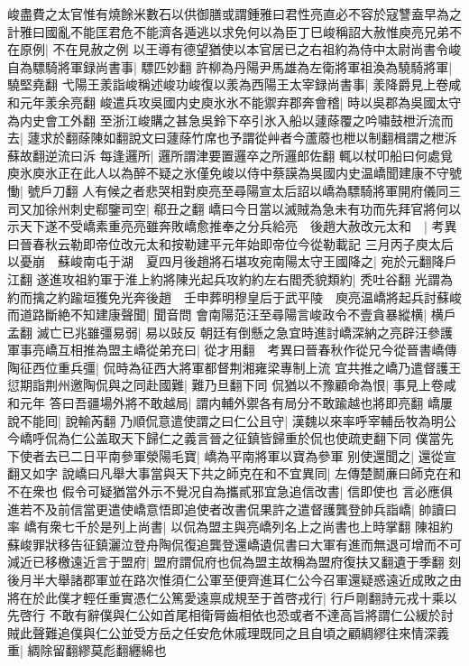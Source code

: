 峻盡費之太官惟有燒餘米數石以供御膳或謂鍾雅曰君性亮直必不容於寇讐盍早為之計雅曰國亂不能匡君危不能濟各遁逃以求免何以為臣丁巳峻稱詔大赦惟庾亮兄弟不在原例|{
	不在見赦之例}
以王導有德望猶使以本官居已之右祖約為侍中太尉尚書令峻自為驃騎將軍録尚書事|{
	驃匹妙翻}
許柳為丹陽尹馬雄為左衛將軍祖渙為驍騎將軍|{
	驍堅堯翻}
弋陽王羕詣峻稱述峻功峻復以羕為西陽王太宰録尚書事|{
	羕降爵見上卷咸和元年羕余亮翻}
峻遣兵攻吳國内史庾氷氷不能禦弃郡奔會稽|{
	時以吳郡為吳國太守為内史會工外翻}
至浙江峻購之甚急吳鈴下卒引氷入船以蘧蒢覆之吟嘯鼓枻沂流而去|{
	蘧求於翻蒢陳如翻說文曰蘧蒢竹席也予謂從艸者今蘆䕠也枻以制翻楫謂之枻泝蘇故翻逆流曰泝}
每逢邏所|{
	邏所謂津要置邏卒之所邏郎佐翻}
輒以杖叩船曰何處覓庾氷庾氷正在此人以為醉不疑之氷僅免峻以侍中蔡謨為吳國内史温嶠聞建康不守號慟|{
	號戶刀翻}
人有候之者悲哭相對庾亮至尋陽宣太后詔以嶠為驃騎將軍開府儀同三司又加徐州刺史郗鑒司空|{
	郗丑之翻}
嶠曰今日當以滅賊為急未有功而先拜官將何以示天下遂不受嶠素重亮亮雖奔敗嶠愈推奉之分兵給亮　後趙大赦改元太和　|{
	考異曰晉春秋云勒即帝位改元太和按勒建平元年始即帝位今從勒載記}
三月丙子庾太后以憂崩　蘇峻南屯于湖　夏四月後趙將石堪攻宛南陽太守王國降之|{
	宛於元翻降戶江翻}
遂進攻祖約軍于淮上約將陳光起兵攻約約左右閻秃貌類約|{
	秃吐谷翻}
光謂為約而擒之約踰垣獲免光奔後趙　壬申葬明穆皇后于武平陵　庾亮温嶠將起兵討蘇峻而道路斷絶不知建康聲聞|{
	聞音問}
會南陽范汪至尋陽言峻政令不壹貪暴縱横|{
	横戶孟翻}
滅亡已兆雖彊易弱|{
	易以䜴反}
朝廷有倒懸之急宜時進討嶠深納之亮辟汪參護軍事亮嶠互相推為盟主嶠從弟充曰|{
	從才用翻　考異曰晉春秋作從兄今從晉書嶠傳}
陶征西位重兵彊|{
	侃時為征西大將軍都督荆湘雍梁專制上流}
宜共推之嶠乃遣督護王愆期詣荆州邀陶侃與之同赴國難|{
	難乃旦翻下同}
侃猶以不豫顧命為恨|{
	事見上卷咸和元年}
答曰吾疆場外將不敢越局|{
	謂内輔外禦各有局分不敢踰越也將即亮翻}
嶠屢說不能囘|{
	說輸芮翻}
乃順侃意遣使謂之曰仁公且守|{
	漢魏以來率呼宰輔岳牧為明公今嶠呼侃為仁公盖取天下歸仁之義言晉之征鎮皆歸重於侃也使疏吏翻下同}
僕當先下使者去已二日平南參軍滎陽毛寶|{
	嶠為平南將軍以寶為參軍}
别使還聞之|{
	還從宣翻又如字}
說嶠曰凡舉大事當與天下共之師克在和不宜異同|{
	左傳楚鬭亷曰師克在和不在衆也}
假令可疑猶當外示不覺况自為攜貳邪宜急追信改書|{
	信即使也}
言必應俱進若不及前信當更遣使嶠意悟即追使者改書侃果許之遣督護龔登帥兵詣嶠|{
	帥讀曰率}
嶠有衆七千於是列上尚書|{
	以侃為盟主與亮嶠列名上之尚書也上時掌翻}
陳祖約蘇峻罪狀移告征鎮灑泣登舟陶侃復追龔登還嶠遺侃書曰大軍有進而無退可增而不可減近已移檄遠近言于盟府|{
	盟府謂侃府也侃為盟主故稱為盟府復扶又翻遺于季翻}
刻後月半大舉諸郡軍並在路次惟須仁公軍至便齊進耳仁公今召軍還疑惑遠近成敗之由將在於此僕才輕任重實憑仁公篤愛遠禀成規至于首啓戎行|{
	行戶剛翻詩元戎十乘以先啓行}
不敢有辭僕與仁公如首尾相衛脣齒相依也恐或者不達高旨將謂仁公緩於討賊此聲難追僕與仁公並受方岳之任安危休戚理既同之且自頃之顧綢繆往來情深義重|{
	綢除留翻繆莫彪翻纒綿也}
